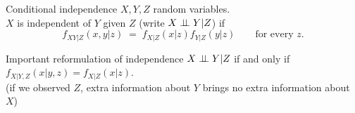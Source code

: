 \documentclass[11pt,handout,aspectratio=169,dvipsnames]{beamer}
\begin{document}
\begin{frame}{Conditional independence}
	$X,Y,Z$ random variables.\\[.3cm]
	\alert{$X$ is independent of $Y$ given $Z$} (write \textcolor{SeaGreen}{$X\perp\!\!\! \perp Y|Z$}) if
	$$
	f_{XY|Z}(x,y|z)\;=\;f_{X|Z}(x|z)f_{Y|Z}(y|z)\qquad\mbox{for every }z.
	$$
%	
		\begin{alertblock}{Important reformulation of independence}
			$X\perp\!\!\! \perp Y|Z$ if and only if $f_{X|Y,Z}(x|y,z)=f_{X|Z}(x|z)$.\\
			(if we observed $Z$, extra information about $Y$ brings no extra information about $X$)
		\end{alertblock}
\end{frame}

%
\end{document}
